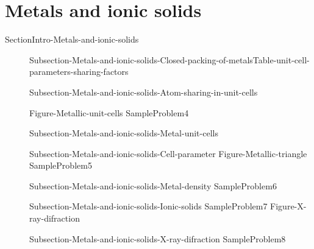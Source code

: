 \documentclass[main.tex]{subfiles}
\newcommand\chapterlabel{Ch-solids}\setcounter{figurenewcounter}{0}\setcounter{tablenewcounter}{0}\setcounter{formulanewcounter}{0}\chapterpicture{../{\chapterlabel}/figure1}\chapterpicturelabel{PxFuel}
\begin{document}
\section{Metals and ionic solids}{SectionIntro-Metals-and-ionic-solids}
\sloppy \begin{description}
\item[] {Subsection-Metals-and-ionic-solids-Closed-packing-of-metals}{Table-unit-cell-parameters-sharing-factors}
\item[]  {Subsection-Metals-and-ionic-solids-Atom-sharing-in-unit-cells}

{Figure-Metallic-unit-cells}
{SampleProblem4}
\item[] {Subsection-Metals-and-ionic-solids-Metal-unit-cells}
\item[]  {Subsection-Metals-and-ionic-solids-Cell-parameter}
{Figure-Metallic-triangle}
{SampleProblem5}
\item[]  {Subsection-Metals-and-ionic-solids-Metal-density}
{SampleProblem6}
\item[] {Subsection-Metals-and-ionic-solids-Ionic-solids}
{SampleProblem7}
{Figure-X-ray-difraction}
\item[] {Subsection-Metals-and-ionic-solids-X-ray-difraction}
{SampleProblem8}
\end{description}
\end{document}
